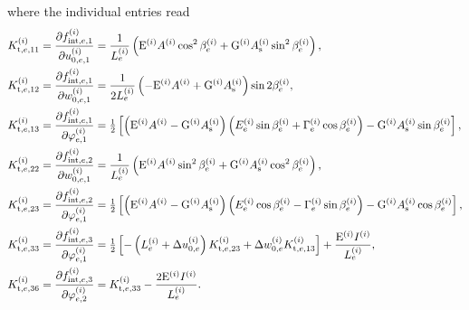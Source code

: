 \documentclass[11pt]{article}
\newcommand{\lay}[1]{^{(#1)}}
\newcommand{\rote}[2]{\varphi\lay{#1}_{#2}}
\newcommand{\uce}[2]{u_{0,#2}\lay{#1}}
\newcommand{\Duc}[2]{\Delta u_{0,#2}\lay{#1}}
\newcommand{\wce}[2]{w_{0,#2}\lay{#1}}
\newcommand{\Dwc}[2]{\Delta w_{0,#2}\lay{#1}}
\newcommand{\Sc}[1]{E\lay{#1}}
\newcommand{\Gc}[1]{\Gamma\lay{#1}}
\newcommand{\half}{\mbox{$\frac{1}{2}$}}
\newcommand{\del}[2]{\mbox{$\displaystyle\frac{#1}{#2}$}}
\newcommand{\ppd}[2]{\del{\partial {#1}}{\partial{#2}}}
\newcommand{\E}[1]{\mathrm{E}\lay{#1}}\newcommand{\G}[1]{\mathrm{G}\lay{#1}}\newcommand{\A}[1]{A\lay{#1}}\newcommand{\I}[1]{I\lay{#1}}\newcommand{\As}[1]{A_\mathrm{s}\lay{#1}}
\newcommand{\el}{e}
\newcommand{\finte}[1]{f_{\mathrm{int},#1}}
\newcommand{\Kt}[1]{K_{\mathrm{t},#1}}
\begin{document}
where the individual entries read
\begin{align*}
\Kt{e,11}\lay{i} 
& =  
\ppd{\finte{e,1}\lay{i}}{\uce{i}{\el,1}} 
= 
\frac{1}{\eL{e}{i}} 
\left( 
  \E{i} \A{i} \cos^2 \beta_\el\lay{i} 
  + 
  \G{i} \As{i} \sin^2 \beta_\el\lay{i} 
\right), 
\\ 
\Kt{e,12}\lay{i} 
& = 
\ppd{\finte{e,1}\lay{i}}{\wce{i}{\el,1}} 
= 
\frac{1}{2\eL{e}{i}} 
\left( 
  -\E{i} \A{i} 
  + 
  \G{i} \As{i} 
\right) 
\sin 2\beta_\el\lay{i}, 
\\
\Kt{e,13}\lay{i} 
& = 
\ppd{\finte{e,1}\lay{i}}{\rote{i}{\el,1}}
= 
\half 
\left[ \left( 
  \E{i}\A{i} 
  - 
  \G{i}\As{i} 
\right) 
\left( 
  \Sc{i}_\el \sin \beta_\el\lay{i} 
  + 
  \Gc{i}_\el \cos \beta_\el\lay{i}
\right) 
- 
\G{i} \As{i} \sin \beta_\el\lay{i} 
\right],
\\
\Kt{e,22}\lay{i} 
& =  
\ppd{\finte{e,2}\lay{i}}{\wce{i}{\el,1}}
= 
\frac{1}{\eL{e}{i}} 
\left( 
  \E{i} \A{i} \sin^2 \beta_\el\lay{i} 
  + 
  \G{i} \As{i} \cos^2 \beta_\el\lay{i} 
\right), 
\\
\Kt{e,23}\lay{i} 
& = 
\ppd{\finte{e,2}\lay{i}}{\rote{i}{\el,1}} 
= 
\half 
\left[ \left( 
  \E{i} \A{i} 
  - 
  \G{i} \As{i} 
\right) 
\left( 
  \Sc{i}_\el \cos \beta_\el\lay{i} 
  - 
  \Gc{i}_\el \sin \beta_\el\lay{i}
\right) 
- 
\G{i} \As{i} \cos \beta_\el\lay{i} 
\right],
\\
\Kt{e,33}\lay{i} 
& = 
\ppd{\finte{e,3}\lay{i}}{\rote{i}{e,1}} 
= 
\half 
\left[ -\left( 
  \eL{e}{i} 
  + 
  \Duc{i}{\el}
\right) \Kt{e,23}\lay{i} 
+ 
\Dwc{i}{\el}
\Kt{e,13}\lay{i} \right] 
+ 
\frac{\E{i}\I{i}}{\eL{e}{i}},
\\
\Kt{e,36}\lay{i} 
&= 
\ppd{\finte{e,3}\lay{i}}{\rote{i}{e,2}} 
= 
\Kt{e,33}\lay{i} 
- 
\frac{2 \E{i} \I{i}}{\eL{e}{i}}.
\end{align*}
\end{document}
